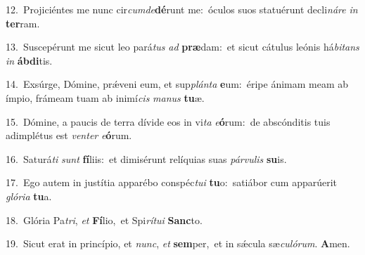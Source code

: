 {\numbfont\textcolor{\numbcolor}{12.}}~Projiciéntes me nunc cir\-\textit{cum}\-\textit{de}\textbf{dé}runt me:~\star óculos suos statuérunt decli\-\textit{ná}\-\textit{re} \textit{in} \textbf{ter}\-ram.\par
{\numbfont\textcolor{\numbcolor}{13.}}~Suscepérunt me sicut leo pará\textit{tus} \textit{ad} \textbf{præ}\-dam:~\star et sicut cátulus leónis há\-\textit{bi}\-\textit{tans} \textit{in} \textbf{áb}\-\textbf{di}tis.\par
{\numbfont\textcolor{\numbcolor}{14.}}~Exsúrge, Dómine, prǽveni eum, et sup\-\textit{plán}\-\textit{ta} \textbf{e}\-um:~\star éripe ánimam meam ab ímpio, frámeam tuam ab inimí\textit{cis} \textit{ma}\-\textit{nus} \textbf{tu}\-æ.\par
{\numbfont\textcolor{\numbcolor}{15.}}~Dómine, a paucis de terra dívide eos in vi\textit{ta} \textit{e}\-\textbf{ó}rum:~\star de abscónditis tuis adimplétus est \textit{ven}\-\textit{ter} \textit{e}\-\textbf{ó}rum.\par
{\numbfont\textcolor{\numbcolor}{16.}}~Saturá\textit{ti} \textit{sunt} \textbf{fí}\-liis:~\star et dimisérunt relíquias suas \textit{pár}\-\textit{vu}\textit{lis} \textbf{su}\-is.\par
{\numbfont\textcolor{\numbcolor}{17.}}~Ego autem in justítia apparébo conspéc\-\textit{tu}\-\textit{i} \textbf{tu}\-o:~\star satiábor cum apparúerit \textit{gló}\-\textit{ri}\textit{a} \textbf{tu}\-a.\par
{\numbfont\textcolor{\numbcolor}{18.}}~Glória Pa\-\textit{tri}\-, \textit{et} \textbf{Fí}\-lio,~\star et Spi\-\textit{rí}\-\textit{tu}\textit{i} \textbf{Sanc}\-to.\par
{\numbfont\textcolor{\numbcolor}{19.}}~Sicut erat in princípio, et \textit{nunc}\-, \textit{et} \textbf{sem}\-per,~\star et in sǽcula sæ\-\textit{cu}\-\textit{ló}\textit{rum}. \textbf{A}\-men.\par
